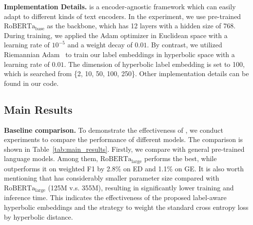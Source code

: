 \noindent\textbf{Implementation Details.} \wsmodelname is a encoder-agnostic framework which can easily adapt to different kinds of text encoders. 
In the experiment, we use pre-trained $\mathrm{RoBERTa}_\mathrm{base}$ as the backbone, which has 12 layers with a hidden size of 768. 
During training, we applied the Adam optimizer in Euclidean space
with a learning rate of $10^{-5}$ and a weight decay of $0.01$. 
By contrast, we utilized Riemannian Adam~\cite{becigneul2018riemannian_adam} 
to train our label
embeddings in hyperbolic space with a learning rate of $0.01$. The dimension of hyperbolic label embedding is set to 100, which is searched from \{2, 10, 50, 100, 250\}. Other implementation details can be found in our code.

\subsection{Main Results}
\label{sec:main_results}
\noindent\textbf{Baseline comparison.} To demonstrate the effectiveness of \modelname, we conduct experiments to compare the performance of different models. The comparison is shown in Table~\ref{tab:main_results}. Firstly, we compare \wsmodelname with general pre-trained language models. Among them, $\mathrm{RoBERTa}_\mathrm{large}$ performs the best, while \wsmodelname outperforms it on weighted F1 by 2.8\% on ED and 1.1\% on GE. It is also worth mentioning that \wsmodelname has considerably smaller parameter size compared with  $\mathrm{RoBERTa}_\mathrm{large}$ (125M v.s. 355M), resulting in significantly lower training and inference time.
This indicates the effectiveness of the proposed label-aware hyperbolic embeddings and the strategy to weight the standard cross entropy loss by hyperbolic distance.  

